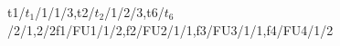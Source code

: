 \begin{specialprocessor}{2}{2}{t1/$t_1$/1/{1}/3,t2/$t_2$/1/{2}/3,t6/$t_6$/2/{1,2}/2}{f1/FU1/1/{2},f2/FU2/1/{1},f3/FU3/1/{1},f4/FU4/1/{2}}
\end{specialprocessor}